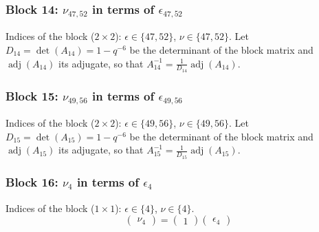 \subsubsection{Block 14: $\nu_{47, 52}$ in terms of $\epsilon_{47, 52}$}
Indices of the block ($2\times 2$): $\epsilon \in \{47, 52\}$, $\nu \in \{47, 52\}$.
Let $D_{14} = \det(A_{14}) = 1-q^{-6}$ be the determinant of the block matrix and $\operatorname{adj}(A_{14})$ its adjugate, so that $A_{14}^{-1} = \frac{1}{D_{14}}\operatorname{adj}(A_{14})$.
\begin{center}
\end{center}

\subsubsection{Block 15: $\nu_{49, 56}$ in terms of $\epsilon_{49, 56}$}
Indices of the block ($2\times 2$): $\epsilon \in \{49, 56\}$, $\nu \in \{49, 56\}$.
Let $D_{15} = \det(A_{15}) = 1-q^{-6}$ be the determinant of the block matrix and $\operatorname{adj}(A_{15})$ its adjugate, so that $A_{15}^{-1} = \frac{1}{D_{15}}\operatorname{adj}(A_{15})$.
\begin{center}
\end{center}

\subsubsection{Block 16: $\nu_{4}$ in terms of $\epsilon_{4}$}
Indices of the block ($1\times 1$): $\epsilon \in \{4\}$, $\nu \in \{4\}$.
\[
\begin{pmatrix}
\nu_{4}
\end{pmatrix}
=
\begin{pmatrix}
1
\end{pmatrix}
\begin{pmatrix}
\epsilon_{4}
\end{pmatrix}
\]

